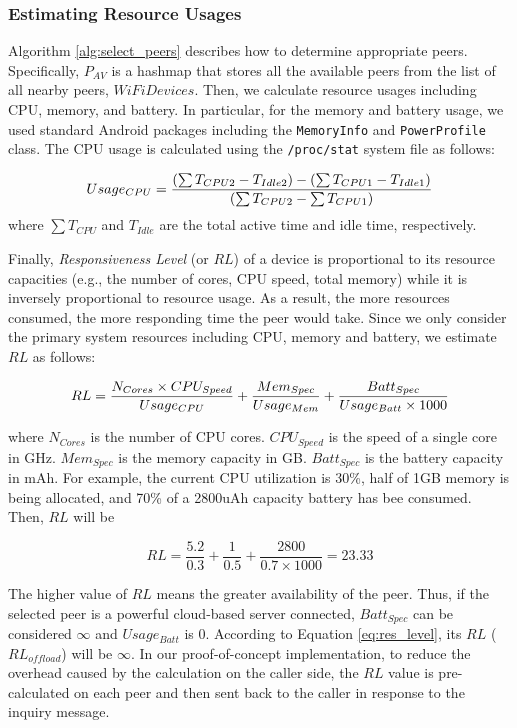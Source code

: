 \documentclass{sig-alternate}
\begin{document}
\subsubsection{Estimating Resource Usages}
Algorithm \ref{alg:select_peers} describes how to determine appropriate peers. Specifically, $P_{AV}$ is a hashmap that stores all the available peers from the list of all nearby peers, $WiFiDevices$. Then, we calculate resource usages including CPU, memory, and battery. In particular, for the memory and battery usage, we used standard Android packages including the \texttt{MemoryInfo} and \texttt{PowerProfile} class. The CPU usage is calculated using the \texttt{/proc/stat} system file as follows:

\begin{equation} 
\label{eq:cpu_usage} \small
Usage_{CPU} = \frac{(\sum{T_{CPU2}} - T_{Idle2}) - (\sum{T_{CPU1}} - T_{Idle1})}{(\sum{T_{CPU2}} - \sum{T_{CPU1}})}
\end{equation}
\noindent
where $\sum{T_{CPU}}$ and $T_{Idle}$ are the total active time and idle time, respectively.


Finally, \emph{Responsiveness Level} (or $RL$) of a device is proportional to its resource capacities (e.g., the number of cores, CPU speed, total memory) while it is inversely proportional to resource usage. As a result, the more resources consumed, the more responding time the peer would take. Since we only consider the primary system resources including CPU, memory and battery, we estimate $RL$ as follows:

\begin{equation}
\label{eq:res_level}
\small
RL = \frac{N_{Cores} \times CPU_{Speed}}{Usage_{CPU}} + \frac{Mem_{Spec}}{Usage_{Mem}} + \frac{Batt_{Spec}}{Usage_{Batt} \times 1000}
\end{equation}

\noindent where $N_{Cores}$ is the number of CPU cores. $CPU_{Speed}$ is the speed of a single core in GHz. $Mem_{Spec}$ is the memory capacity in GB. $Batt_{Spec}$ is the battery capacity in mAh. For example, the current CPU utilization is 30\%, half of 1GB memory is being allocated, and 70\% of a 2800uAh capacity battery has bee consumed. Then, $RL$ will be 

\begin{small} $$RL = \frac{5.2}{0.3} + \frac{1}{0.5} + \frac{2800}{0.7 \times 1000} = 23.33$$ \end{small}

The higher value of $RL$ means the greater availability of the peer. Thus, if the selected peer is a powerful cloud-based server connected, $Batt_{Spec}$ can be considered $\infty$ and $Usage_{Batt}$ is 0. According to Equation \ref{eq:res_level}, its $RL$ ($RL_{offload}$) will be $\infty$. In our proof-of-concept implementation, to reduce the overhead caused by the calculation on the caller side, the $RL$ value is pre-calculated on each peer and then sent back to the caller in response to the inquiry message.
\end{document}
